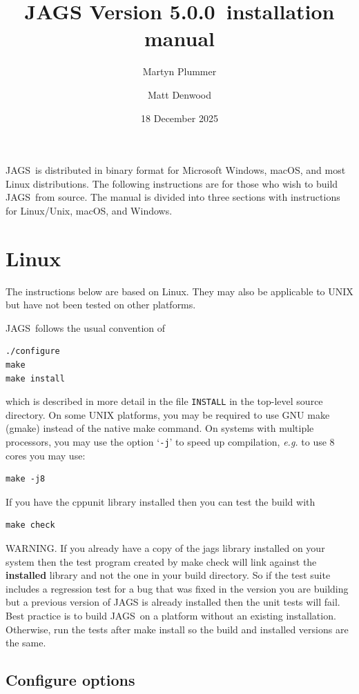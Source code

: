 \documentclass[11pt, a4paper, titlepage]{article}
\newcommand{\release}{5.0.0}
\newcommand{\JAGS}{\textsf{JAGS}}
\newcommand{\code}[1]{{\bgroup{\normalfont\ttfamily #1}\egroup}}
\newcommand{\samp}[1]{{`\bgroup\normalfont\texttt{#1}'\egroup}}
\let\option=\samp
\begin{document}
\title{JAGS Version \release\ installation manual}
\author{Martyn Plummer \and Matt Denwood}
\date{18 December 2025}
\maketitle

\JAGS\ is distributed in binary format for Microsoft Windows, macOS, 
and most Linux distributions.  The following instructions are for
those who wish to build \JAGS\ from source. The manual is divided
into three sections with instructions for Linux/Unix, macOS, and Windows.

\clearpage
\section{Linux}

The instructions below are based on Linux. They may also be applicable
to UNIX but have not been tested on other platforms.

\JAGS\ follows the usual convention of 
\begin{verbatim}
./configure
make
make install
\end{verbatim}
which is described in more detail in the file \texttt{INSTALL} in
the top-level source directory. On some UNIX platforms, you may
be required to use GNU make (gmake) instead of the native make
command. On systems with multiple processors, you may use the option 
\option{-j} to speed up compilation, {\em e.g.} to use 8 cores you
may use:
\begin{verbatim}
make -j8
\end{verbatim}
If you have the cppunit library installed then you can test the build with
\begin{verbatim}
make check
\end{verbatim}
WARNING. If you already have a copy of the jags library installed on
your system then the test program created by \code{make check} will
link against the {\bf installed} library and not the one in your build
directory. So if the test suite includes a regression test for a bug
that was fixed in the version you are building but a previous version
of JAGS is already installed then the unit tests will fail. Best
practice is to build \JAGS\ on a platform without an existing
installation.  Otherwise, run the tests after \code{make install} so
the build and installed versions are the same.

\subsection{Configure options}
\end{document}
